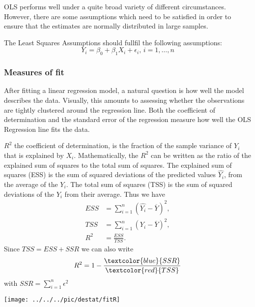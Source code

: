 OLS performs well under a quite broad variety of different circumstances. However, there are some assumptions which need to be satisfied in order to ensure that the estimates are normally distributed in large samples.

The Least Squares Assumptions should fullfil the following assumptions:
\[Y_i = \beta_0 + \beta_1 X_i + \epsilon_i \text{, } i = 1,\dots,n\]

\subsubsection*{Measures of fit}

After fitting a linear regression model, a natural question is how well the model describes the data. Visually, this amounts to assessing whether the observations are tightly clustered around the regression line. Both the coefficient of determination and the standard error of the regression measure how well the OLS Regression line fits the data.

$R^2$ the coefficient of determination, is the fraction of the sample variance of $Y_i$ that is explained by $X_i$. Mathematically, the $R^2$ can be written as the ratio of the explained sum of squares to the total sum of squares. The explained sum of squares (ESS) is the sum of squared deviations of the predicted values $\hat{Y_i}$, from the average of the $Y_i$. The total sum of squares (TSS) is the sum of squared deviations of the $Y_i$ from their average. Thus we have
\begin{align}
ESS & =  \sum_{i = 1}^n \left( \hat{Y_i} - \overline{Y} \right)^2,   \\
TSS & =  \sum_{i = 1}^n \left( Y_i - \overline{Y} \right)^2,   \\
R^2 & = \frac{ESS}{TSS}.
\end{align}
Since $TSS = ESS + SSR$ we can also write
\[R^2 = 1- \frac{\textcolor{blue}{SSR}}{\textcolor{red}{TSS}}\]
with $SSR= \sum_{i = 1}^n \epsilon^2$

\begin{center}
	\texttt{[image: ../../../pic/destat/fitR]}
\end{center}



